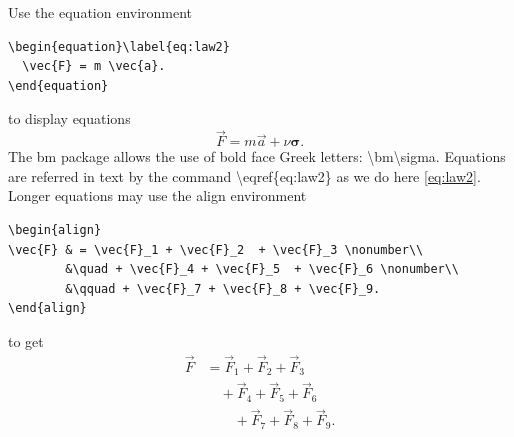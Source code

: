 \documentclass{article}
\begin{document}
Use the equation environment
\begin{verbatim}
\begin{equation}\label{eq:law2}
  \vec{F} = m \vec{a}.
\end{equation}	 
\end{verbatim}
to display equations
\begin{equation}\label{eq:law2}
		\vec{F} = m \vec{a} + \nu \bm\sigma.
\end{equation}
The {\ttfamily bm} package allows the use of bold face Greek letters: \textbackslash {\ttfamily bm}\textbackslash {\ttfamily sigma}. Equations are referred in text by the command \textbackslash{\ttfamily eqref}\{{\ttfamily eq:law2}\} as we do here \eqref{eq:law2}.
Longer equations may use the align environment
\begin{verbatim}
\begin{align}
\vec{F} & = \vec{F}_1 + \vec{F}_2  + \vec{F}_3 \nonumber\\
        &\quad + \vec{F}_4 + \vec{F}_5  + \vec{F}_6 \nonumber\\
        &\qquad + \vec{F}_7 + \vec{F}_8 + \vec{F}_9.
\end{align}
\end{verbatim}
to get
\begin{align}
\vec{F} & = \vec{F}_1 +  \vec{F}_2  +  \vec{F}_3  \nonumber \\
 &\quad + \vec{F}_4 +  \vec{F}_5  +  \vec{F}_6  \nonumber \\
 &\qquad + \vec{F}_7 + \vec{F}_8 + \vec{F}_9.
\end{align}
\end{document}

